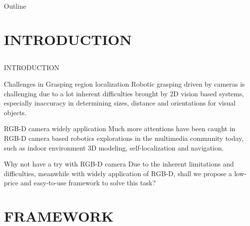 \documentclass[xcolor=table,compress,blue]{beamer}
\begin{document}
\frame{
    \titlepage
    \thispagestyle{empty}
}
\begin{frame}{Outline}
  \tableofcontents
\end{frame}

\section{INTRODUCTION}
\subsection{}
\begin{frame}{INTRODUCTION}%
	\begin{exampleblock}{Challenges in Grasping region localization}
		Robotic grasping driven by cameras is challenging due to
		a lot inherent difficulties brought by 2D vision based systems, especially inaccuracy in determining sizes, distance and orientations for visual objects. 
	\end{exampleblock}
	\pause
	\begin{exampleblock}{RGB-D camera widely application}
		 Much more attentions have been caught in RGB-D camera
		 based robotics explorations in the multimedia community today, such as indoor environment 3D modeling, self-localization and navigation. 
	\end{exampleblock}
	\pause
	\begin{exampleblock}{Why not have a try with RGB-D camera}
		Due to the inherent limitations and difficulties, meanwhile with widely application of RGB-D, shall we propose a low-price and easy-to-use framework to solve this task? 
	\end{exampleblock}
\end{frame}

\iffalse
\begin{frame}{RELATED WORK}
	\begin{exampleblock}{BACKGROUND}
		
	\end{exampleblock}
\end{frame}
\fi



 
\section{FRAMEWORK}
\end{document}
